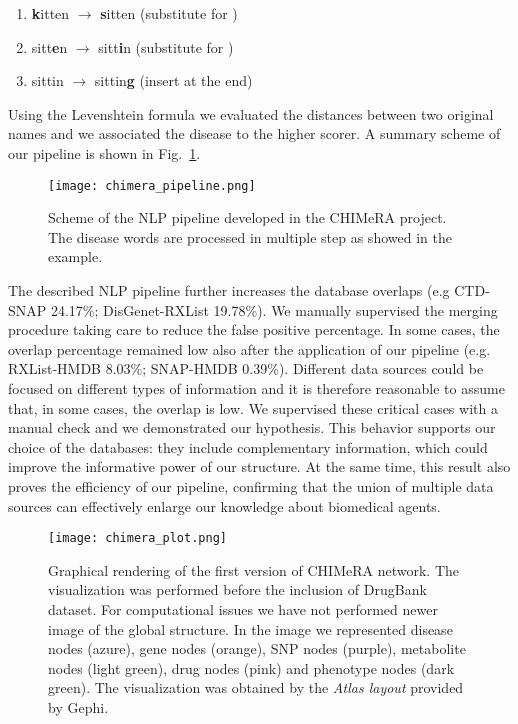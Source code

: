 \documentclass{standalone}
\begin{document}
\begin{enumerate}

  \item \textbf{k}itten $\rightarrow$ \textbf{s}itten (substitute  for )
  \item sitt\textbf{e}n $\rightarrow$ sitt\textbf{i}n (substitute  for )
  \item sittin $\rightarrow$ sittin\textbf{g} (insert  at the end)

\end{enumerate}

Using the Levenshtein formula we evaluated the distances between two original names and we associated the disease to the higher scorer.
A summary scheme of our pipeline is shown in Fig.~\ref{fig:chimera_pipe}.

\begin{figure}[htbp]
\centering
\texttt{[image: chimera\_pipeline.png]}
\caption{Scheme of the NLP pipeline developed in the \textsf{CHIMeRA} project.
The disease words are processed in multiple step as showed in the example.
}
\label{fig:chimera_pipe}
\end{figure}

The described NLP pipeline further increases the database overlaps (e.g CTD-SNAP 24.17\%; DisGenet-RXList 19.78\%).
We manually supervised the merging procedure taking care to reduce the false positive percentage.
In some cases, the overlap percentage remained low also after the application of our pipeline (e.g. RXList-HMDB 8.03\%; SNAP-HMDB 0.39\%).
Different data sources could be focused on different types of information and it is therefore reasonable to assume that, in some cases, the overlap is low.
We supervised these critical cases with a manual check and we demonstrated our hypothesis.
This behavior supports our choice of the databases: they include complementary information, which could improve the informative power of our structure.
At the same time, this result also proves the efficiency of our pipeline, confirming that the union of multiple data sources can effectively enlarge our knowledge about biomedical agents.

\begin{figure}[htbp]
\centering
\texttt{[image: chimera\_plot.png]}
\caption{Graphical rendering of the first version of \textsf{CHIMeRA} network.
The visualization was performed before the inclusion of DrugBank dataset.
For computational issues we have not performed newer image of the global structure.
In the image we represented disease nodes (azure), gene nodes (orange), SNP nodes (purple), metabolite nodes (light green), drug nodes (pink) and phenotype nodes (dark green).
The visualization was obtained by the \emph{Atlas layout} provided by \textsf{Gephi}.
}
\label{fig:chimera}
\end{figure}
\end{document}
